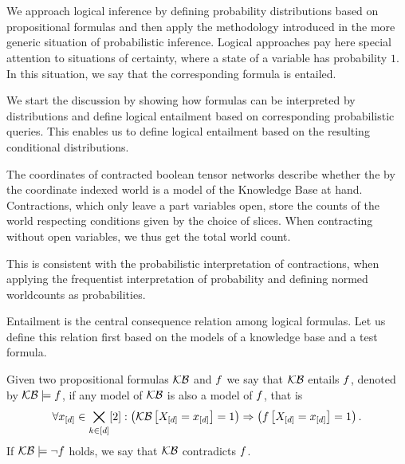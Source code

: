 \chapter{\chatextlogicalReasoning}\label{cha:logicalReasoning}

We approach logical inference by defining probability distributions based on propositional formulas and then apply the methodology introduced in the more generic situation of probabilistic inference.
Logical approaches pay here special attention to situations of certainty, where a state of a variable has probability $1$.
In this situation, we say that the corresponding formula is entailed.


We start the discussion by showing how formulas can be interpreted by distributions and define logical entailment based on corresponding probabilistic queries.
This enables us to define logical entailment based on the resulting conditional distributions.


\begin{remark}
	The coordinates of contracted boolean tensor networks describe whether the by the coordinate indexed world is a model of the Knowledge Base at hand.
	Contractions, which only leave a part variables open, store the counts of the world respecting conditions given by the choice of slices. 
	When contracting without open variables, we thus get the total world count.
	
	This is consistent with the probabilistic interpretation of contractions, when applying the frequentist interpretation of probability and defining normed worldcounts as probabilities.
\end{remark}



Entailment is the central consequence relation among logical formulas.
Let us define this relation first based on the models of a knowledge base and a test formula.

\begin{definition}\label{def:logicalEntailment}
	Given two propositional formulas $\mathcal{KB}$ and $f$ we say that $\mathcal{KB}$ entails $f$, denoted by $\mathcal{KB}\models f$, if any model of $\mathcal{KB}$ is also a model of $f$, that is
	\begin{align*}
		\forall{x_{[d]}\in\bigtimes_{k\in[d]}[2]}:{\left(\mathcal{KB}\left[X_{[d]}=x_{[d]}\right]=1\right)\Rightarrow\left(f\left[X_{[d]}=x_{[d]}\right]=1\right)} \, .
	\end{align*}
	If $\mathcal{KB}\models\lnot f$ holds, we say that $\mathcal{KB}$ contradicts $f$.
\end{definition}

